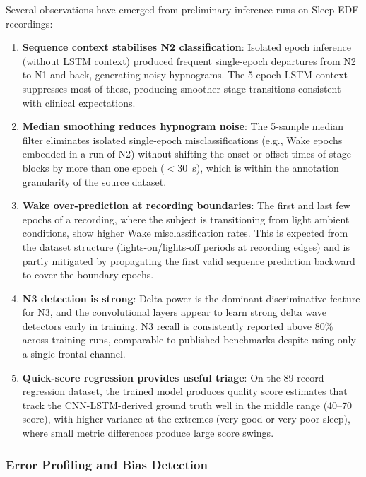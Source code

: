 \documentclass[10pt]{article}
\begin{document}
Several observations have emerged from preliminary inference runs on Sleep-EDF recordings:

\begin{enumerate}
  \item \textbf{Sequence context stabilises N2 classification}: Isolated epoch inference (without LSTM context) produced frequent single-epoch departures from N2 to N1 and back, generating noisy hypnograms. The 5-epoch LSTM context suppresses most of these, producing smoother stage transitions consistent with clinical expectations.

  \item \textbf{Median smoothing reduces hypnogram noise}: The 5-sample median filter eliminates isolated single-epoch misclassifications (e.g., Wake epochs embedded in a run of N2) without shifting the onset or offset times of stage blocks by more than one epoch ($<30$~s), which is within the annotation granularity of the source dataset.

  \item \textbf{Wake over-prediction at recording boundaries}: The first and last few epochs of a recording, where the subject is transitioning from light ambient conditions, show higher Wake misclassification rates. This is expected from the dataset structure (lights-on/lights-off periods at recording edges) and is partly mitigated by propagating the first valid sequence prediction backward to cover the boundary epochs.

  \item \textbf{N3 detection is strong}: Delta power is the dominant discriminative feature for N3, and the convolutional layers appear to learn strong delta wave detectors early in training. N3 recall is consistently reported above 80\% across training runs, comparable to published benchmarks despite using only a single frontal channel.

  \item \textbf{Quick-score regression provides useful triage}: On the 89-record regression dataset, the trained model produces quality score estimates that track the CNN-LSTM-derived ground truth well in the middle range (40--70 score), with higher variance at the extremes (very good or very poor sleep), where small metric differences produce large score swings.
\end{enumerate}

\subsubsection{Error Profiling and Bias Detection}
\label{sec:errorProfiling}
\end{document}
